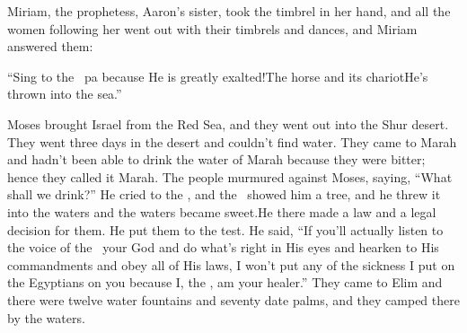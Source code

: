 \begin{inparaenum}
   Miriam, the prophetess, Aaron's sister, took the timbrel in her hand, and all the women following her went out with their timbrels and dances,%
   and Miriam answered them:\smallskip%

  \pb{}``Sing to the \lord\ pa because He is greatly exalted!\pa{}The horse and its chariot\pa{}He's thrown into the sea.''%

   Moses brought Israel from the Red Sea, and they went out into the Shur desert. They went three days in the desert and couldn't find water.%
   They came to Marah and hadn't been able to drink the water of Marah because they were bitter; hence they called it Marah.%
   The people murmured against Moses, saying, ``What shall we drink?''%
   He cried to the \lord, and the \lord\ showed him a tree, and he threw it into the waters and the waters became sweet.\hspace*{4em}He there made a law and a legal decision for them. He put them to the test.%
   He said, ``If you'll actually listen to the voice of the \lord\ your God and do what's right in His eyes and hearken to His commandments and obey all of His laws, I won't put any of the sickness I put on the Egyptians on you because I, the \lord, am your healer.''%
   They came to Elim and there were twelve water fountains and seventy date palms, and they camped there by the waters.%
\end{inparaenum}

